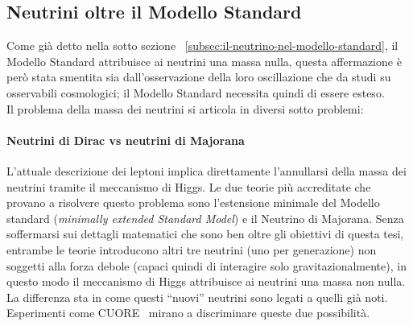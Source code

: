 \documentclass[../../main.tex]{subfiles}
\begin{document}
\subsection{Neutrini oltre il Modello Standard}
  \label{subsec:neutrini-oltre-il-modello-standard}
  Come già detto nella sotto sezione
  ~\ref{subsec:il-neutrino-nel-modello-standard}, il Modello Standard
  attribuisce ai neutrini una massa nulla, questa affermazione è però stata
  smentita sia dall'osservazione della loro oscillazione che da studi su
  osservabili cosmologici; il Modello Standard necessita quindi di essere
  esteso.\\
  Il problema della massa dei neutrini si articola in diversi sotto problemi:

  \paragraph{Neutrini di Dirac vs neutrini di Majorana \cite[Capitolo 6]
  {10.1093/acprof:oso/9780198508717.001.0001}}
    L'attuale descrizione dei leptoni implica direttamente l'annullarsi della
    massa dei neutrini tramite il meccanismo di Higgs.
    Le due teorie più accreditate che provano a risolvere questo problema sono
    l'estensione minimale del Modello standard
    (\textit{minimally extended Standard Model}) e il Neutrino di Majorana.
    Senza soffermarsi sui dettagli matematici che sono ben oltre gli obiettivi
    di questa tesi, entrambe le teorie introducono altri tre neutrini (uno per
    generazione) non soggetti alla forza debole (capaci quindi di interagire
    solo gravitazionalmente), in questo modo il meccanismo di Higgs attribuisce
    ai neutrini una massa non nulla.
    La differenza sta in come questi ``nuovi'' neutrini sono legati a quelli già
    noti.
    Esperimenti come CUORE~\cite{ADAMS2022103902} mirano a discriminare queste
    due possibilità.
\end{document}
